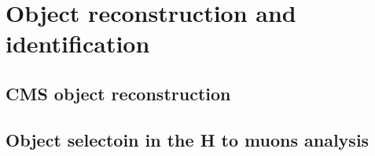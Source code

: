 \chapter{Object reconstruction and identification}\label{chp:objects}

\section{CMS object reconstruction}

\section{Object selectoin in the H to muons analysis}